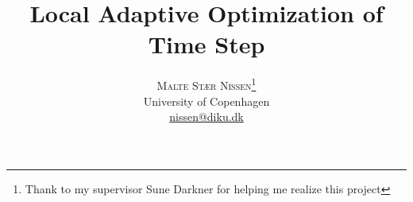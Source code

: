 \documentclass[twoside]{article}
\title{\vspace{-15mm}\fontsize{24pt}{10pt}\selectfont\textbf{Local Adaptive
Optimization of Time Step}} %
\author{
\large
\textsc{Malte Stær Nissen}\thanks{Thank to my supervisor Sune Darkner for
helping me realize this project}\\[2mm] %
\normalsize University of Copenhagen \\ %
\normalsize \href{mailto:nissen@diku.dk}{nissen@diku.dk} %
\vspace{-5mm}
}
\date{}
\begin{document}
\maketitle %

\thispagestyle{fancy} %


\begin{abstract}


\end{abstract}

\end{document}
